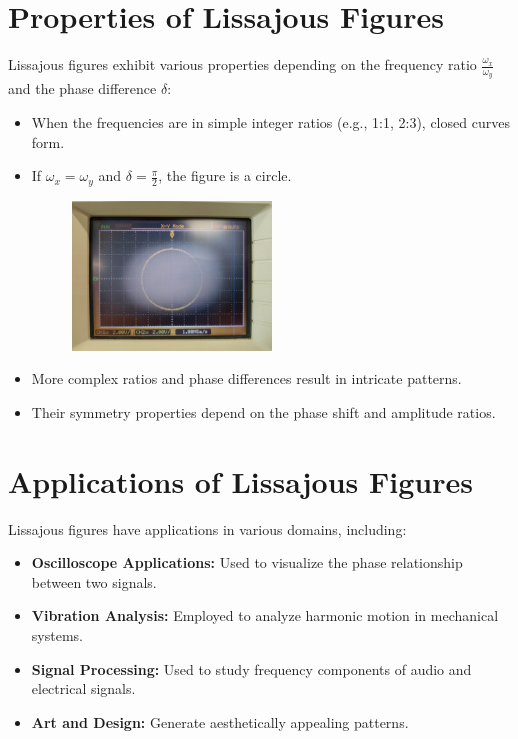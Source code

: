 \documentclass{article}
\begin{document}
\section{Properties of Lissajous Figures}
Lissajous figures exhibit various properties depending on the frequency ratio $\frac{\omega_x}{\omega_y}$ and the phase difference $\delta$:
\begin{itemize}
\item When the frequencies are in simple integer ratios (e.g., 1:1, 2:3), closed curves form.
\item If $\omega_x = \omega_y$ and $\delta = \frac{\pi}{2}$, the figure is a circle.

\begin{figure}[h!]
\centering
\includegraphics[width=0.5\textwidth]{figs/fig.png}
\label{fig:lissajous}
\end{figure}

\item More complex ratios and phase differences result in intricate patterns.
\item Their symmetry properties depend on the phase shift and amplitude ratios.
\end{itemize}

\section{Applications of Lissajous Figures}
Lissajous figures have applications in various domains, including:
\begin{itemize}
\item \textbf{Oscilloscope Applications:} Used to visualize the phase relationship between two signals.
\item \textbf{Vibration Analysis:} Employed to analyze harmonic motion in mechanical systems.
\item \textbf{Signal Processing:} Used to study frequency components of audio and electrical signals.
\item \textbf{Art and Design:} Generate aesthetically appealing patterns.
\end{itemize}
\end{document}
